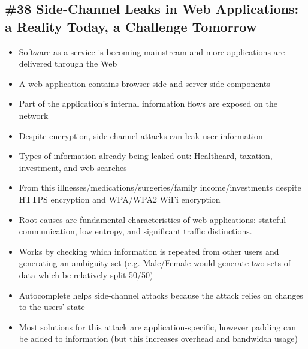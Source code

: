 \subsection{\#38 Side-Channel Leaks in Web Applications: a Reality Today, a Challenge Tomorrow}
\begin{itemize}
	\item Software-as-a-service is becoming mainstream and more applications are delivered through the Web
	\item A web application contains browser-side and server-side components
	\item Part of the application's internal information flows are exposed on the network
	\item Despite encryption, side-channel attacks can leak user information
	\item Types of information already being leaked out: Healthcard, taxation, investment, and web searches
	\item From this illnesses/medications/surgeries/family income/investments despite HTTPS encryption and WPA/WPA2 WiFi encryption
	\item Root causes are fundamental characteristics of web applications: stateful communication, low entropy, and significant traffic distinctions.
	\item Works by checking which information is repeated from other users and generating an ambiguity set (e.g. Male/Female would generate two sets of data which be relatively split 50/50)
	\item Autocomplete helps side-channel attacks because the attack relies on changes to the users' state
	\item Most solutions for this attack are application-specific, however padding can be added to information (but this increases overhead and bandwidth usage)
\end{itemize}